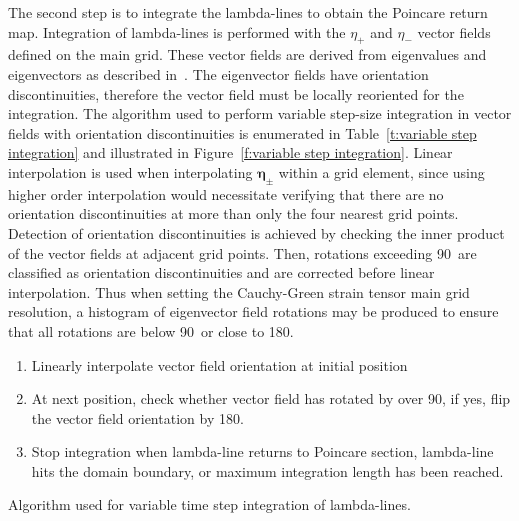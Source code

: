 \documentclass{article}
\begin{document}
The second step is to integrate the lambda-lines to obtain the Poincare return map. Integration of lambda-lines is performed with the $\eta_+$ and $\eta_-$ vector fields defined on the main grid. These vector fields are derived from eigenvalues and eigenvectors as described in~\textcite{farazmand12:_comput_lagran}. The eigenvector fields have orientation discontinuities, therefore the vector field must be locally reoriented for the integration. The algorithm used to perform variable step-size integration in vector fields with orientation discontinuities is enumerated in Table~\ref{t:variable step integration} and illustrated in Figure~\ref{f:variable step integration}. Linear interpolation is used when interpolating $\boldsymbol \eta_\pm$ within a grid element, since using higher order interpolation would necessitate verifying that there are no orientation discontinuities at more than only the four nearest grid points. Detection of orientation discontinuities is achieved by checking the inner product of the vector fields at adjacent grid points. Then, rotations exceeding 90\degree\, are classified as orientation discontinuities and are corrected before linear interpolation. Thus when setting the Cauchy-Green strain tensor main grid resolution, a histogram of eigenvector field rotations may be produced to ensure that all rotations are below 90\degree\, or close to 180\degree.

\begin{table}
\begin{enumerate}
\item Linearly interpolate vector field orientation at initial position
\item At next position, check whether vector field has rotated by over 90\degree, if yes, flip the vector field orientation by 180\degree.
\item Stop integration when lambda-line returns to Poincare section, lambda-line hits the domain boundary, or maximum integration length has been reached.
\end{enumerate}
\caption{Algorithm used for variable time step integration of lambda-lines.}
\label{t:variable step integration}
\end{table}
\end{document}
